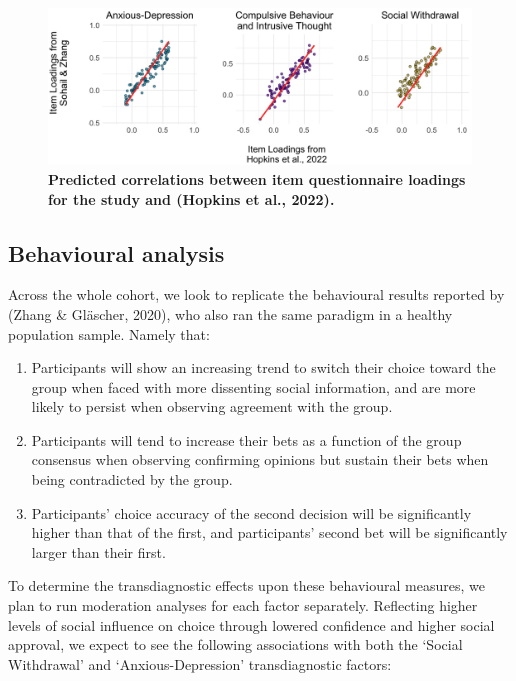 \documentclass[12pt,a4paper,oneside,]{book} %
\begin{document}
\begin{figure}
\includegraphics[width=1\linewidth]{figures/factor_correlations} \caption{{\textbf{Predicted correlations between item questionnaire loadings for the study and (Hopkins et al., 2022).}}}\label{fig:figure-3-factor-correlations}
\end{figure}



\subsection{Behavioural analysis}\label{behavioural-analysis}

Across the whole cohort, we look to replicate the behavioural results reported by (Zhang \& Gläscher, 2020), who also ran the same paradigm in a healthy population sample. Namely that:

\begin{enumerate}
\def\labelenumi{\arabic{enumi}.}
\item
  Participants will show an increasing trend to switch their choice toward the group when faced with more dissenting social information, and are more likely to persist when observing agreement with the group.
\item
  Participants will tend to increase their bets as a function of the group consensus when observing confirming opinions but sustain their bets when being contradicted by the group.
\item
  Participants' choice accuracy of the second decision will be significantly higher than that of the first, and participants' second bet will be significantly larger than their first.
\end{enumerate}

To determine the transdiagnostic effects upon these behavioural measures, we plan to run moderation analyses for each factor separately. Reflecting higher levels of social influence on choice through lowered confidence and higher social approval, we expect to see the following associations with both the `Social Withdrawal' and `Anxious-Depression' transdiagnostic factors:
\end{document}
